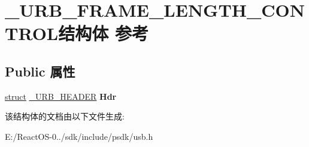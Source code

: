 \hypertarget{struct___u_r_b___f_r_a_m_e___l_e_n_g_t_h___c_o_n_t_r_o_l}{}\section{\+\_\+\+U\+R\+B\+\_\+\+F\+R\+A\+M\+E\+\_\+\+L\+E\+N\+G\+T\+H\+\_\+\+C\+O\+N\+T\+R\+O\+L结构体 参考}
\label{struct___u_r_b___f_r_a_m_e___l_e_n_g_t_h___c_o_n_t_r_o_l}
\subsection*{Public 属性}
\begin{DoxyCompactItemize}
\item 
\mbox{\label{struct___u_r_b___f_r_a_m_e___l_e_n_g_t_h___c_o_n_t_r_o_l_a793fa08199c6e9f1f3233a70d5fd488c}} 
\hyperlink{interfacestruct}{struct} \hyperlink{struct___u_r_b___h_e_a_d_e_r}{\+\_\+\+U\+R\+B\+\_\+\+H\+E\+A\+D\+ER} {\bfseries Hdr}
\end{DoxyCompactItemize}


该结构体的文档由以下文件生成\+:\begin{DoxyCompactItemize}
\item 
E\+:/\+React\+O\+S-\/0../sdk/include/psdk/usb.\+h\end{DoxyCompactItemize}
